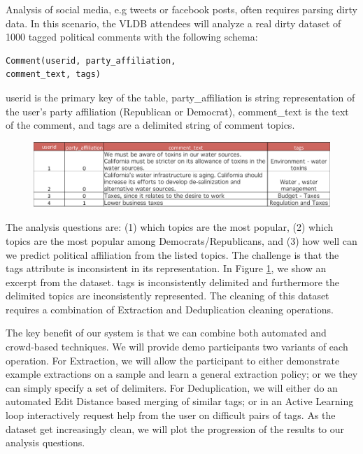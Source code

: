 \begin{demonstration}
Analysis of social media, e.g tweets or facebook posts, often requires parsing dirty data.
In this scenario, the VLDB attendees will analyze a real dirty dataset of 1000 tagged political comments with the following schema:
\begin{lstlisting}
Comment(userid, party_affiliation, 
comment_text, tags)
\end{lstlisting}
\textsf{userid} is the primary key of the table, \textsf{party\_affiliation} is string representation of the user's party affiliation (Republican or Democrat), 
\textsf{comment\_text} is the text of the comment, and \textsf{tags} are a delimited string of comment topics.

\begin{figure}[tup]
\centering
\includegraphics[width=\columnwidth]{figs/dirty-data.pdf}
\caption{ \label{fig:dsample}}\vspace{-.5em}
\end{figure}

The analysis questions are: (1) which topics are the most popular, (2) which topics are the most popular among Democrats/Republicans, and (3) how well can we predict political affiliation from the listed topics.
The challenge is that the \textsf{tags} attribute is inconsistent in its representation.
In Figure \ref{fig:dsample}, we show an excerpt from the dataset.
\textsf{tags} is inconsistently delimited and furthermore the delimited topics are inconsistently represented.
The cleaning of this dataset requires a combination of Extraction and Deduplication cleaning operations.

The key benefit of our system is that we can combine both automated and crowd-based techniques.
We will provide demo participants two variants of each operation.
For Extraction, we will allow the participant to either demonstrate example extractions on a sample and learn a general extraction policy; or we 
they can simply specify a set of delimiters.
For Deduplication, we will either do an automated Edit Distance based merging of similar tags; or in an Active Learning loop interactively request help from the user on difficult pairs of tags.
As the dataset get increasingly clean, we will plot the progression of the results to our analysis questions.
\end{demonstration}

